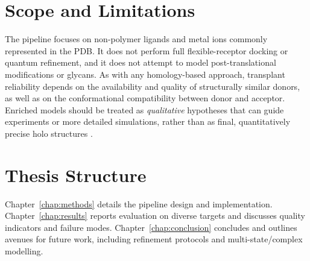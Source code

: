 \section{Scope and Limitations}
The pipeline focuses on non-polymer ligands and metal ions commonly represented in the PDB. It does not perform full flexible-receptor docking or quantum refinement, and it does not attempt to model post-translational modifications or glycans. As with any homology-based approach, transplant reliability depends on the availability and quality of structurally similar donors, as well as on the conformational compatibility between donor and acceptor. Enriched models should be treated as \emph{qualitative} hypotheses that can guide experiments or more detailed simulations, rather than as final, quantitatively precise holo structures \cite{hekkelmanAlphaFillEnrichingAlphaFold2023}.

\section{Thesis Structure}
Chapter~\ref{chap:methods} details the pipeline design and implementation. Chapter~\ref{chap:results} reports evaluation on diverse targets and discusses quality indicators and failure modes. Chapter~\ref{chap:conclusion} concludes and outlines avenues for future work, including refinement protocols and multi-state/complex modelling.
